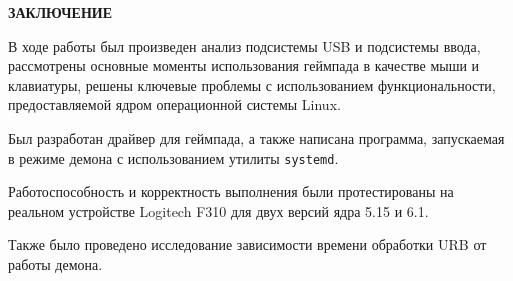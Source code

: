 \begin{center}
    {\bfseries\Large ЗАКЛЮЧЕНИЕ}
\end{center}

В ходе работы был произведен анализ подсистемы USB и подсистемы ввода, рассмотрены основные моменты использования геймпада в качестве мыши и клавиатуры, решены ключевые проблемы с использованием функциональности, предоставляемой ядром операционной системы Linux.

Был разработан драйвер для геймпада, а также написана программа, запускаемая в режиме демона с использованием утилиты \texttt{systemd}.

Работоспособность и корректность выполнения были протестированы на реальном устройстве Logitech F310 для двух версий ядра 5.15 и 6.1.

Также было проведено исследование зависимости времени обработки URB от работы демона.

\pagebreak
